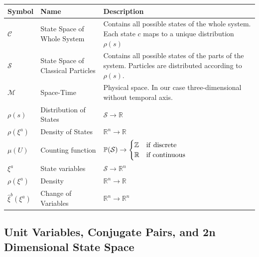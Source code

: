 \documentclass{article}
\begin{document}
\begin{center}
\renewcommand{\arraystretch}{1.6}
 \begin{tabular}{p{} p{} p{}}
 \hline
 Symbol & Name & Description \\ [0.5ex] 
 \hline\hline
 $\mathcal{C}$ & State Space of Whole System & Contains all possible states of the whole system. Each state $c$ maps to a unique distribution $\rho(s)$\\ [2ex]
 \hline
 $\mathcal{S}$ & State Space of Classical Particles & Contains all possible states of the parts of the system. Particles are distributed according to $\rho(s)$. \\ [2ex]
 \hline
 $\mathcal{M}$ & Space-Time & Physical space. In our case three-dimensional without temporal axis. \\ [1ex] 
 \hline
 $\rho(s)$ & Distribution of States & $\mathcal{S} \to \mathbb{R}$ \\
 \hline
 $\rho(\xi^a)$ & Density of States & $\mathbb{R}^n \to \mathbb{R}$ \\
 \hline
 $\mu(U)$ & Counting function & $\mathbb{P}(\mathcal{S}) \to \begin{cases}
 \mathbb{Z} & \text{if \textrm{discrete}}\\
 \mathbb{R} & \textrm{if continuous} \end{cases}$ \\ [2.3ex]
 \hline
 $\xi^a$ & State variables & $\mathcal{S} \to \mathbb{R}^n$ \\
 \hline
 $\rho(\xi^a)$ & Density & $\mathbb{R}^n \to \mathbb{R}$ \\
 \hline
 $\hat{\xi}^b(\xi^a)$ & Change of Variables & $\mathbb{R}^n \to \mathbb{R}^n$ \\ [1ex] 
 \hline
\end{tabular}
\end{center}

\subsection{Unit Variables, Conjugate Pairs, and 2n Dimensional State Space}
\end{document}

